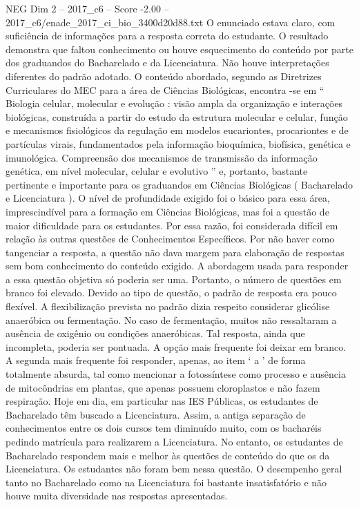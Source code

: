 \begin{textsample}{NEG Dim 2 – 2017\_c6 – Score -2.00 – 2017\_c6/enade\_2017\_ci\_bio\_3400d20d88.txt}
O enunciado estava claro, com suficiência de informações para a resposta correta do estudante.
O resultado demonstra que faltou conhecimento ou houve esquecimento do conteúdo por parte dos graduandos do Bacharelado e da Licenciatura.
Não houve interpretações diferentes do padrão adotado.
O conteúdo abordado, segundo as Diretrizes Curriculares do MEC para a área de Ciências Biológicas, encontra -se em “ Biologia celular, molecular e evolução : visão ampla da organização e interações biológicas, construída a partir do estudo da estrutura molecular e celular, função e mecanismos fisiológicos da regulação em modelos eucariontes, procariontes e de partículas virais, fundamentados pela informação bioquímica, biofísica, genética e imunológica.
Compreensão dos mecanismos de transmissão da informação genética, em nível molecular, celular e evolutivo ” e, portanto, bastante pertinente e importante para os graduandos em Ciências Biológicas ( Bacharelado e Licenciatura ).
O nível de profundidade exigido foi o básico para essa área, imprescindível para a formação em Ciências Biológicas, mas foi a questão de maior dificuldade para os estudantes.
Por essa razão, foi considerada difícil em relação às outras questões de Conhecimentos Específicos.
Por não haver como tangenciar a resposta, a questão não dava margem para elaboração de respostas sem bom conhecimento do conteúdo exigido.
A abordagem usada para responder a essa questão objetiva só poderia ser uma.
Portanto, o número de questões em branco foi elevado.
Devido ao tipo de questão, o padrão de resposta era pouco flexível.
A flexibilização prevista no padrão dizia respeito considerar glicólise anaeróbica ou fermentação.
No caso de fermentação, muitos não ressaltaram a ausência de oxigênio ou condições anaeróbicas.
Tal resposta, ainda que incompleta, poderia ser pontuada.
A opção mais frequente foi deixar em branco.
A segunda mais frequente foi responder, apenas, ao item ‘ a ’ de forma totalmente absurda, tal como mencionar a fotossíntese como processo e ausência de mitocôndrias em plantas, que apenas possuem cloroplastos e não fazem respiração.
Hoje em dia, em particular nas IES Públicas, os estudantes de Bacharelado têm buscado a Licenciatura.
Assim, a antiga separação de conhecimentos entre os dois cursos tem diminuído muito, com os bacharéis pedindo matrícula para realizarem a Licenciatura.
No entanto, os estudantes de Bacharelado respondem mais e melhor às questões de conteúdo do que os da Licenciatura.
Os estudantes não foram bem nessa questão.
O desempenho geral tanto no Bacharelado como na Licenciatura foi bastante insatisfatório e não houve muita diversidade nas respostas apresentadas.

\end{textsample}
